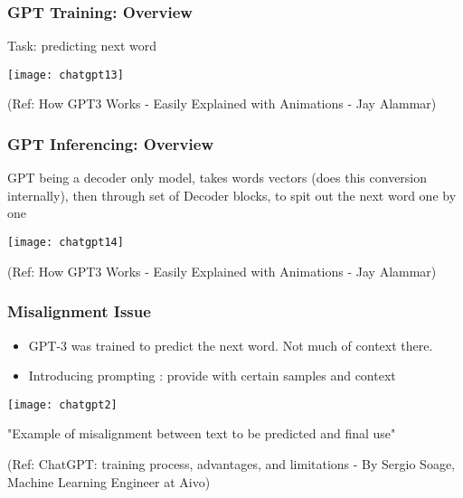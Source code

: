 \begin{frame}[fragile]\frametitle{GPT Training: Overview}


Task: predicting next word

\begin{center}
\texttt{[image: chatgpt13]}
\end{center}		


{\tiny (Ref: How GPT3 Works - Easily Explained with Animations - Jay Alammar)}

\end{frame}

\begin{frame}[fragile]\frametitle{GPT Inferencing: Overview}


GPT being a decoder only model, takes words vectors (does this conversion internally), then through set of Decoder blocks, to spit out the next word one by one

\begin{center}
\texttt{[image: chatgpt14]}
\end{center}		


{\tiny (Ref: How GPT3 Works - Easily Explained with Animations - Jay Alammar)}

\end{frame}

\begin{frame}[fragile]\frametitle{Misalignment Issue}


\begin{itemize}
\item GPT-3 was trained to predict the next word. Not much of context there.
\item Introducing prompting : provide with certain samples and context

\end{itemize}	 

			\begin{center}
			\texttt{[image: chatgpt2]}
			
			{\tiny "Example of misalignment between text to be predicted and final use"}
			\end{center}		
			
			
			{\tiny (Ref: ChatGPT: training process, advantages, and limitations - By Sergio Soage, Machine Learning Engineer at Aivo)}
			
\end{frame}


